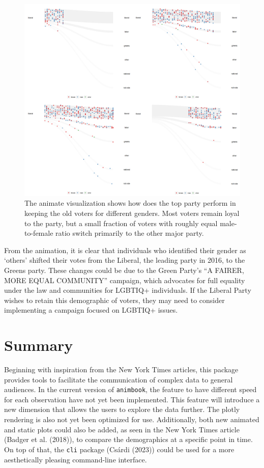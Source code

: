 \begin{figure}

{\centering \includegraphics[width=1\linewidth]{figures/animation-voter} 

}

\caption{The animate visualization shows how does the top party perform in keeping the old voters for different genders. Most voters remain loyal to the party, but a small fraction of voters with roughly equal male-to-female ratio switch primarily to the other major party.}\label{fig:voter-figure}
\end{figure}

From the animation, it is clear that individuals who identified their gender as `others' shifted their votes from the Liberal, the leading party in 2016, to the Greens party. These changes could be due to the Green Party's ``A FAIRER, MORE EQUAL COMMUNITY'' campaign, which advocates for full equality under the law and communities for LGBTIQ+ individuals. If the Liberal Party wishes to retain this demographic of voters, they may need to consider implementing a campaign focused on LGBTIQ+ issues.

\hypertarget{summary}{%
\section{Summary}\label{summary}}

Beginning with inspiration from the New York Times articles, this package provides tools to facilitate the communication of complex data to general audiences. In the current version of \texttt{animbook}, the feature to have different speed for each observation have not yet been implemented. This feature will introduce a new dimension that allows the users to explore the data further. The plotly rendering is also not yet been optimized for use. Additionally, both new animated and static plots could also be added, as seen in the New York Times article (Badger et al. (2018)), to compare the demographics at a specific point in time. On top of that, the \texttt{cli} package (Csárdi (2023)) could be used for a more aesthetically pleasing command-line interface.

